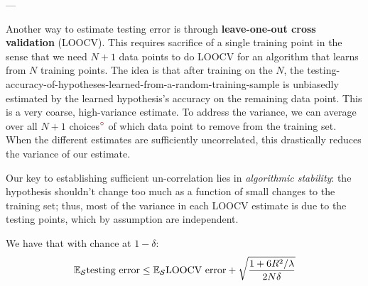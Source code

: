 \documentclass[11pt, justified]{tufte-book}
\newcommand{\bcirc}{${\bro ^\circ}$}
\newcommand{\sampassage}[1]{
   \vspace{0.1cm}
   \par\noindent{\hspace{-2cm}\normalsize \sc \gre #1} ---
}
\newcommand{\Ee}{\mathbb{E}}\newcommand{\eE}{\mathcal{E}}
\newcommand{\Rr}{\mathbb{R}}\newcommand{\rR}{\mathcal{R}}
\theoremstyle{definition}
\begin{document}
      \sampassage{data-based bounds}
        Another way to estimate testing error is through \textbf{leave-one-out
        cross validation} (LOOCV).  This requires sacrifice of a single
        training point in the sense that we need $N+1$ data points to do LOOCV
        for an algorithm that learns from $N$ training points.  
        The idea is that after training on the $N$, the
        testing-accuracy-of-hypotheses-learned-from-a-random-training-sample is
        unbiasedly estimated by the learned hypothesis's accuracy on the
        remaining data point.  This is a very coarse, high-variance estimate.
        To address the variance, we can average over all $N+1$ choices\bcirc{}
        of which data point to remove from the training set.  When the
        different estimates are sufficiently uncorrelated, this drastically
        reduces the variance of our estimate.

        Our key to establishing sufficient un-correlation lies in
        \emph{algorithmic stability}: the hypothesis shouldn't change too much
        as a function of small changes to the training set; thus, most of the
        variance in each LOOCV estimate is due to the testing points, which by
        assumption are independent.

        We have that with chance at $1-\delta$: 
        $$
            \Ee_{\sS}
            \text{testing error}
            \leq
            \Ee_{\sS}
            \text{LOOCV error}
            +
            \sqrt{\frac{1+6R^2/\lambda}{2N\delta}}
        $$



\end{document}
